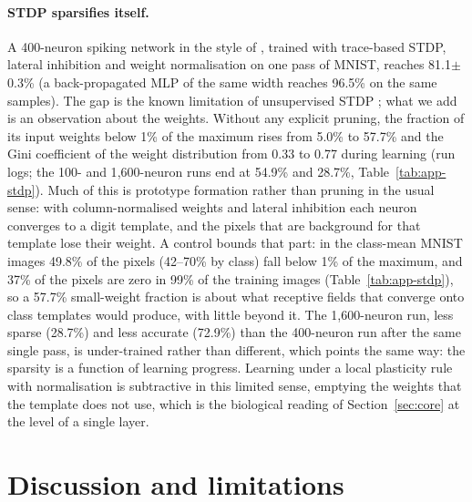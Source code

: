 \documentclass[11pt]{article}
\begin{document}
\paragraph{STDP sparsifies itself.} A 400-neuron spiking network in the style of \citet{diehl2015}, trained with
trace-based STDP, lateral inhibition and weight normalisation on one pass of MNIST, reaches 81.1$\pm$0.3\% (a
back-propagated MLP of the same width reaches 96.5\% on the same samples). The gap is the known limitation of unsupervised
STDP \citep{eshraghian2023,dong2023}; what we add is an observation about the weights. Without any explicit pruning, the
fraction of its input weights below 1\% of the maximum rises from 5.0\% to 57.7\% and the Gini coefficient of the weight
distribution from 0.33 to 0.77 during learning (run logs; the 100- and 1{,}600-neuron runs end at 54.9\% and 28.7\%,
Table~\ref{tab:app-stdp}). Much of this is prototype formation rather than pruning in the usual sense: with column-normalised
weights and lateral inhibition each neuron converges to a digit template, and the pixels that are background for that
template lose their weight. A control bounds that part: in the class-mean MNIST images 49.8\% of the pixels (42--70\% by
class) fall below 1\% of the maximum, and 37\% of the pixels are zero in 99\% of the training images (Table~\ref{tab:app-stdp}),
so a 57.7\% small-weight fraction is about what receptive fields that converge onto class templates would produce, with
little beyond it. The 1{,}600-neuron run, less sparse (28.7\%) and less accurate (72.9\%) than the 400-neuron run after the
same single pass, is under-trained rather than different, which points the same way: the sparsity is a function of learning
progress. Learning under a local plasticity rule with normalisation is subtractive in this limited sense, emptying the
weights that the template does not use, which is the biological reading of Section~\ref{sec:core} at the level of a single
layer.

\section{Discussion and limitations}
\label{sec:discussion}
\end{document}
